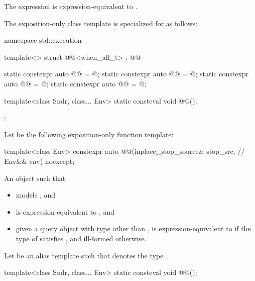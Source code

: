 \pnum
The expression  is expression-equivalent to
.

\pnum
The exposition-only class template 
is specialized for  as follows:
\begin{codeblock}
namespace std::execution {
  template<>
  struct @@<when_all_t> : @@ {
    static constexpr auto @@ = @\seebelow@;
    static constexpr auto @@ = @\seebelow@;
    static constexpr auto @@ = @\seebelow@;
    static constexpr auto @@ = @\seebelow@;

    template<class Sndr, class... Env>
      static consteval void @@();
  };
}
\end{codeblock}

\pnum
Let  be
the following exposition-only function template:
\begin{codeblock}
template<class Env>
  constexpr auto @@(inplace_stop_source& stop_src,               // \expos
                                   Env&& env) noexcept;
\end{codeblock}

\pnum
\returns
An object  such that
\begin{itemize}
\item
{} models , and
\item
{} is expression-equivalent to
, and
\item
given a query object 
with type other than \cv{} ,
 is expression-equivalent to 
if the type of  satisfies , and
ill-formed otherwise.
\end{itemize}

\pnum
Let  be an alias template such that
 denotes the type
.

\begin{itemdecl}
template<class Sndr, class... Env>
  static consteval void @@();
\end{itemdecl}

